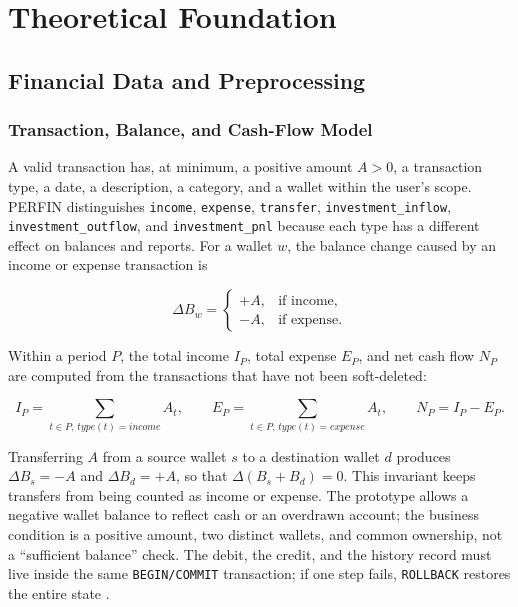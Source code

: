 \chapter{Theoretical Foundation}
\label{chap:theory}

\section{Financial Data and Preprocessing}

\subsection{Transaction, Balance, and Cash-Flow Model}

A valid transaction has, at minimum, a positive amount $A>0$, a
transaction type, a date, a description, a category, and a wallet within
the user's scope. PERFIN distinguishes \texttt{income},
\texttt{expense}, \texttt{transfer}, \texttt{investment\_inflow},
\texttt{investment\_outflow}, and \texttt{investment\_pnl} because each
type has a different effect on balances and reports. For a wallet $w$,
the balance change caused by an income or expense transaction is

\begin{equation}
  \Delta B_w=
  \left\{
  \begin{array}{ll}
    +A, & \mbox{if income},\\
    -A, & \mbox{if expense}.
  \end{array}
  \right.
\end{equation}

Within a period $P$, the total income $I_P$, total expense $E_P$, and
net cash flow $N_P$ are computed from the transactions that have not
been soft-deleted:

\begin{equation}
  I_P=\sum_{t\in P,\,type(t)=income}A_t,\qquad
  E_P=\sum_{t\in P,\,type(t)=expense}A_t,\qquad
  N_P=I_P-E_P.
\end{equation}

Transferring $A$ from a source wallet $s$ to a destination wallet $d$
produces $\Delta B_s=-A$ and $\Delta B_d=+A$, so that
$\Delta(B_s+B_d)=0$. This invariant keeps transfers from being counted
as income or expense. The prototype allows a negative wallet balance to
reflect cash or an overdrawn account; the business condition is a
positive amount, two distinct wallets, and common ownership, not a
``sufficient balance'' check. The debit, the credit, and the history
record must live inside the same \texttt{BEGIN/COMMIT} transaction; if
one step fails, \texttt{ROLLBACK} restores the entire state
\cite{postgresql2026}.

